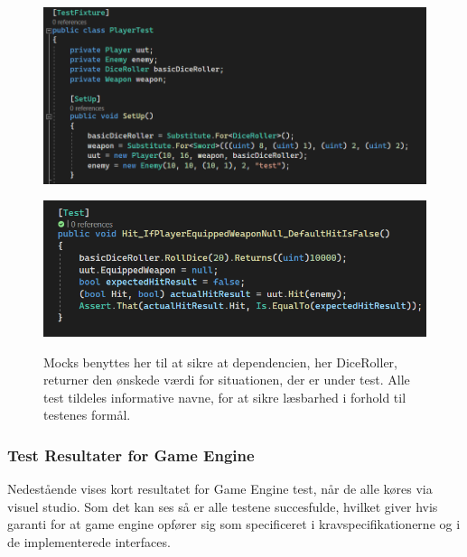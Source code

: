 \begin{figure}[h]
  \centering
  \caption{}
  \includegraphics[scale=0.5]{02-Body/Images/Mocks_And_Dependency_Injection.png}
  \label{fig:mock}
\end{figure}

\begin{figure}[h]
  \centering
  \caption{Mocks benyttes her til at sikre at dependencien, her DiceRoller, returner
           den ønskede værdi for situationen, der er under test.
           Alle test tildeles informative navne, for at sikre læsbarhed i forhold 
           til testenes formål.}
  \includegraphics[scale=0.45]{02-body/Images/useofmocks.png}
  \label{fig:mockuse}
\end{figure}

\newpage 

\subsubsection{Test Resultater for Game Engine}
Nedestående vises kort resultatet for Game Engine test, når de alle køres via visuel studio. Som det kan ses så er alle testene succesfulde, hvilket giver hvis garanti for at
game engine opfører sig som specificeret i kravspecifikationerne og i de implementerede interfaces.

